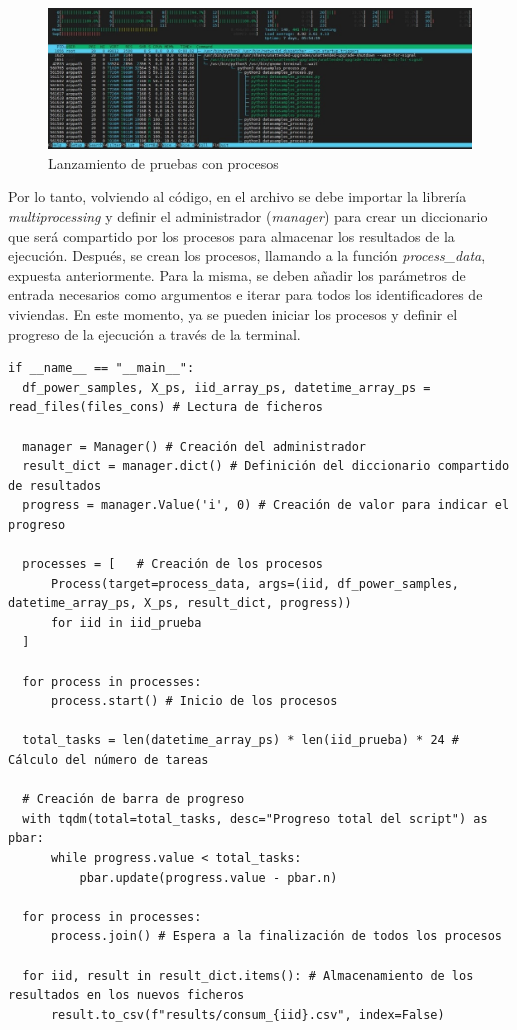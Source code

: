 \vspace{3mm}

\begin{figure}[h!]
  \centering
  \includegraphics[width=1\textwidth]{img/diseno/multiprocess.jpg}
  \caption{Lanzamiento de pruebas con procesos}
  \label{fig:multiprocess}
\end{figure}

\vspace{3mm}

Por lo tanto, volviendo al código, en el archivo se debe importar la librería \textit{multiprocessing} y definir el administrador (\textit{manager}) para crear un diccionario que será compartido por los procesos para almacenar los resultados de la ejecución. Después, se crean los procesos, llamando a la función \textit{process\_data}, expuesta anteriormente. Para la misma, se deben añadir los parámetros de entrada necesarios como argumentos e iterar para todos los identificadores de viviendas. En este momento, ya se pueden iniciar los procesos y definir el progreso de la ejecución a través de la terminal. 

\vspace{3mm}

\begin{lstlisting}[style=Python, caption={Creación de procesos}]
  if __name__ == "__main__":
  df_power_samples, X_ps, iid_array_ps, datetime_array_ps = read_files(files_cons) # Lectura de ficheros

  manager = Manager() # Creación del administrador
  result_dict = manager.dict() # Definición del diccionario compartido de resultados
  progress = manager.Value('i', 0) # Creación de valor para indicar el progreso

  processes = [   # Creación de los procesos
      Process(target=process_data, args=(iid, df_power_samples, datetime_array_ps, X_ps, result_dict, progress))
      for iid in iid_prueba
  ]

  for process in processes: 
      process.start() # Inicio de los procesos

  total_tasks = len(datetime_array_ps) * len(iid_prueba) * 24 # Cálculo del número de tareas

  # Creación de barra de progreso
  with tqdm(total=total_tasks, desc="Progreso total del script") as pbar:
      while progress.value < total_tasks:
          pbar.update(progress.value - pbar.n)

  for process in processes:
      process.join() # Espera a la finalización de todos los procesos

  for iid, result in result_dict.items(): # Almacenamiento de los resultados en los nuevos ficheros
      result.to_csv(f"results/consum_{iid}.csv", index=False) 
\end{lstlisting}

